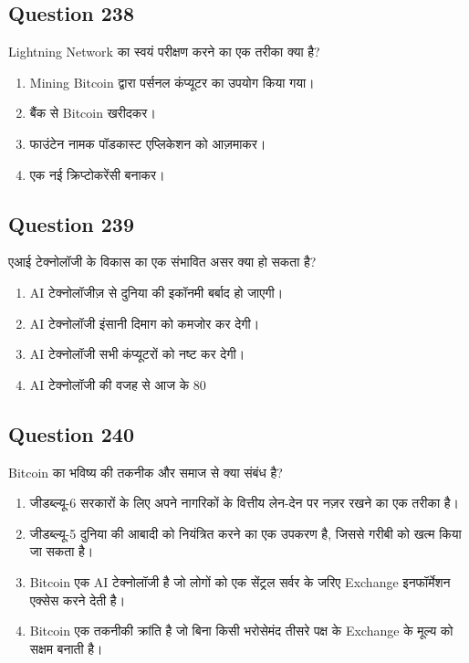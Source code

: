\documentclass[12pt,a4paper]{article}
\begin{document}
\bigskip


\subsection*{Question 238}
Lightning Network का स्वयं परीक्षण करने का एक तरीका क्या है?

\begin{enumerate}[label=\Alph*., leftmargin=*]
\item Mining Bitcoin द्वारा पर्सनल कंप्यूटर का उपयोग किया गया।
\item बैंक से Bitcoin खरीदकर।
\item फाउंटेन नामक पॉडकास्ट एप्लिकेशन को आज़माकर।
\item एक नई क्रिप्टोकरेंसी बनाकर।
\end{enumerate}

\bigskip


\subsection*{Question 239}
एआई टेक्नोलॉजी के विकास का एक संभावित असर क्या हो सकता है?

\begin{enumerate}[label=\Alph*., leftmargin=*]
\item AI टेक्नोलॉजीज़ से दुनिया की इकॉनमी बर्बाद हो जाएगी।
\item AI टेक्नोलॉजी इंसानी दिमाग को कमजोर कर देगी।
\item AI टेक्नोलॉजी सभी कंप्यूटरों को नष्ट कर देगी।
\item AI टेक्नोलॉजी की वजह से आज के 80%
\end{enumerate}

\bigskip


\subsection*{Question 240}
Bitcoin का भविष्य की तकनीक और समाज से क्या संबंध है?

\begin{enumerate}[label=\Alph*., leftmargin=*]
\item जीडब्ल्यू-6 सरकारों के लिए अपने नागरिकों के वित्तीय लेन-देन पर नज़र रखने का एक तरीका है।
\item जीडब्ल्यू-5 दुनिया की आबादी को नियंत्रित करने का एक उपकरण है, जिससे गरीबी को खत्म किया जा सकता है।
\item Bitcoin एक AI टेक्नोलॉजी है जो लोगों को एक सेंट्रल सर्वर के जरिए Exchange इनफॉर्मेशन एक्सेस करने देती है।
\item Bitcoin एक तकनीकी क्रांति है जो बिना किसी भरोसेमंद तीसरे पक्ष के Exchange के मूल्य को सक्षम बनाती है।
\end{enumerate}
\end{document}

